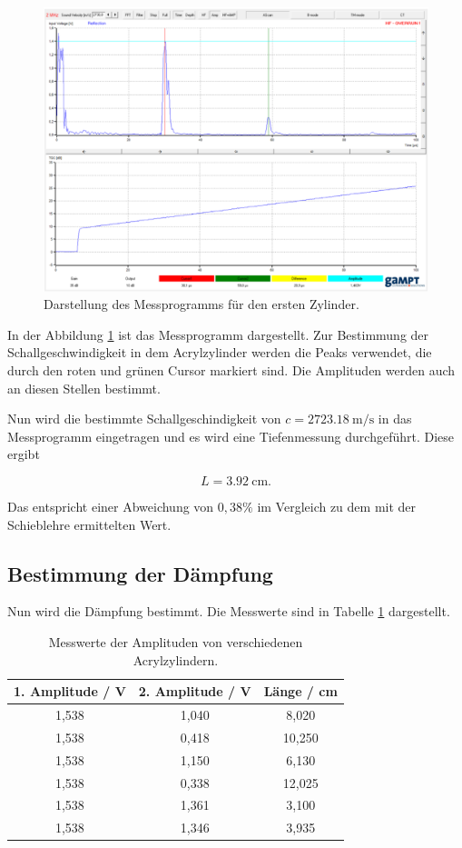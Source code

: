 \begin{figure}[H]
  \centering
  \includegraphics[width=\textwidth]{content/Programm.png}
  \caption{Darstellung des Messprogramms für den ersten Zylinder.}
  \label{abb:1}
\end{figure}

In der Abbildung \ref{abb:1} ist das Messprogramm dargestellt. Zur Bestimmung der
Schallgeschwindigkeit in dem Acrylzylinder werden die Peaks verwendet, die durch
den roten und grünen Cursor markiert sind. Die Amplituden werden auch an diesen Stellen
bestimmt.

Nun wird die bestimmte Schallgeschindigkeit von $c = \SI{2723.18}{\meter\per\second}$
in das Messprogramm eingetragen und es wird eine Tiefenmessung durchgeführt.
Diese ergibt

\begin{equation*}
  L = \SI{3.92}{\centi\meter}.
\end{equation*}

Das entspricht einer Abweichung von $0,38 \%$ im Vergleich zu dem mit der Schieblehre ermittelten Wert.

\subsection{Bestimmung der Dämpfung}

Nun wird die Dämpfung bestimmt. Die Messwerte sind in Tabelle \ref{tab:3} dargestellt.

\begin{table}[H]
  \centering
  \caption{Messwerte der Amplituden von verschiedenen Acrylzylindern.}
  \label{tab:3}
  \begin{tabular}{c c c}
    \toprule
    1. Amplitude / V & 2. Amplitude / V & Länge / cm \\
    \midrule
    1,538 & 1,040 &  8,020 \\
    1,538 & 0,418 & 10,250 \\
    1,538 & 1,150 &  6,130 \\
    1,538 & 0,338 & 12,025 \\
    1,538 & 1,361 &  3,100 \\
    1,538 & 1,346 &  3,935 \\
    \bottomrule
  \end{tabular}
\end{table}

